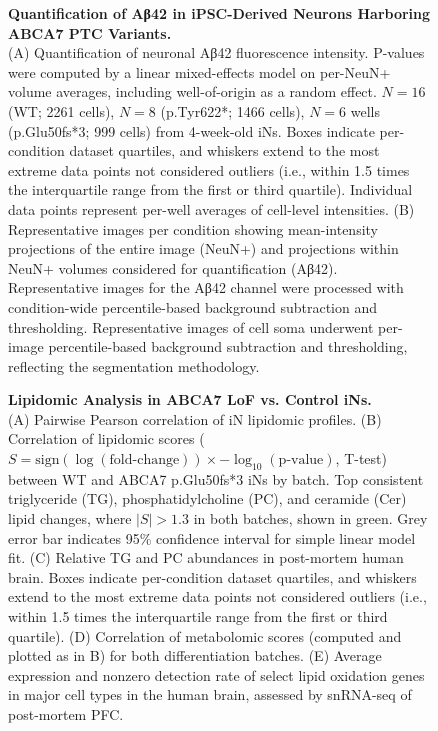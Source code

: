 \begin{figure}[ht]
    \centering
    \caption{
        \textbf{Quantification of Aβ42 in iPSC-Derived Neurons Harboring ABCA7 PTC Variants.}\\[1ex]
        (A) Quantification of neuronal Aβ42 fluorescence intensity. P-values were computed by a linear mixed-effects model on per-NeuN+ volume averages, including well-of-origin as a random effect. $N = 16$ (WT; 2261 cells), $N=8$ (p.Tyr622*; 1466 cells), $N=6$ wells (p.Glu50fs*3; 999 cells) from 4-week-old iNs. Boxes indicate per-condition dataset quartiles, and whiskers extend to the most extreme data points not considered outliers (i.e., within 1.5 times the interquartile range from the first or third quartile). Individual data points represent per-well averages of cell-level intensities. 
        (B) Representative images per condition showing mean-intensity projections of the entire image (NeuN+) and projections within NeuN+ volumes considered for quantification (Aβ42). Representative images for the Aβ42 channel were processed with condition-wide percentile-based background subtraction and thresholding. Representative images of cell soma underwent per-image percentile-based background subtraction and thresholding, reflecting the segmentation methodology.
    }
    \label{fig:quantification_Abeta42_iPSC_neurons}
\end{figure}

\begin{figure}[ht]
    \centering
    \caption{
        \textbf{Lipidomic Analysis in ABCA7 LoF vs. Control iNs.}\\[1ex]
        (A) Pairwise Pearson correlation of iN lipidomic profiles. 
        (B) Correlation of lipidomic scores ($S = \text{sign}(\log(\text{fold-change})) \times -\log_{10}(\text{p-value})$, T-test) between WT and ABCA7 p.Glu50fs*3 iNs by batch. Top consistent triglyceride (TG), phosphatidylcholine (PC), and ceramide (Cer) lipid changes, where $|S| > 1.3$ in both batches, shown in green. Grey error bar indicates 95\% confidence interval for simple linear model fit. 
        (C) Relative TG and PC abundances in post-mortem human brain. Boxes indicate per-condition dataset quartiles, and whiskers extend to the most extreme data points not considered outliers (i.e., within 1.5 times the interquartile range from the first or third quartile). 
        (D) Correlation of metabolomic scores (computed and plotted as in B) for both differentiation batches. 
        (E) Average expression and nonzero detection rate of select lipid oxidation genes in major cell types in the human brain, assessed by snRNA-seq of post-mortem PFC.
    }
    \label{fig:lipidomic_analysis_iPSC_neurons}
\end{figure}

